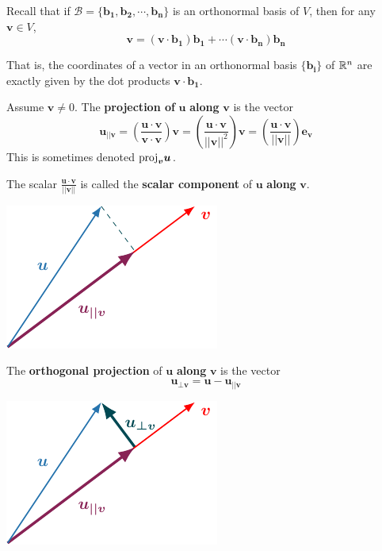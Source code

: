 \begin{proposition}\label{coeffdotprod}
    Recall that if $\mathscr{B} = \{\bm{b_1}, \bm{b_2}, \cdots, \bm{b_n}\}$ is an orthonormal basis of $V$, then for any $\bm{v} \in V$, $$\bm{v} = (\bm{v}\cdot \bm{b_1}) \bm{b_1} + \cdots (\bm{v}\cdot \bm{b_n})  \bm{b_n}$$ 
    \end{proposition}

That is, the coordinates of a vector in an orthonormal basis $\{\bm{b_i}\}$ of $\mathbb{R}^n$ are exactly given by the dot products $\bm{v}\cdot \bm{b_1}$.



\begin{definition}
    Assume $\bm{v} \neq 0$.  The \textbf{projection of} $\bm{u}$ \textbf{along} $\bm{v}$ is the vector
    $$\bm{u_{||v}} = \left(\frac{\bm{u} \cdot \bm{v}}{\bm{v} \cdot \bm{v}}\right)\bm{v} 
    = \left(\frac{\bm{u} \cdot \bm{v}}{||\bm{v}||^2}\right)\bm{v} = \left(\frac{\bm{u} \cdot \bm{v}}{||\bm{v}||}\right)\bm{e_v}$$
    This is sometimes denoted $\textnormal{proj}_{\bm{v}}\bm{u}$.  
    
    \vspace{1em}
    
    The scalar $\frac{\bm{u} \cdot \bm{v}}{||\bm{v}||}$ is called the \textbf{scalar component} of $\bm{u}$ \textbf{along} $\bm{v}$.
    \end{definition}
    
     \begin{center}        
        \includegraphics{chapters/1-LinearAlgebra/figures/figures-vectorprojection.pdf}
    \end{center}
    
    \begin{definition}
    The \textbf{orthogonal projection} of $\bm{u}$ \textbf{along} $\bm{v}$ is the vector $$\bm{u_{\bot v}} = \bm{u} - \bm{u_{||v}}$$
    \end{definition}
    
     \begin{center}        
        \includegraphics{chapters/1-LinearAlgebra/figures/figures-vectororthogonal.pdf}
    \end{center}

